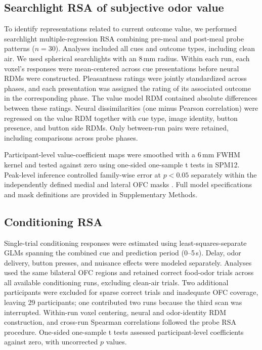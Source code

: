 \documentclass[12pt,letterpaper]{article}
\DeclareRobustCommand{\hl}{\textcolor{reviewtext}}
\begin{document}
\subsection*{Searchlight RSA of subjective odor value}

To identify representations related to current outcome value, we performed searchlight multiple-regression RSA combining pre-meal and post-meal probe patterns ($n = 30$). Analyses included all cues and outcome types, including clean air. We used spherical searchlights with an 8\,mm radius. Within each run, each voxel's responses were mean-centered across cue presentations before neural RDMs were constructed. Pleasantness ratings were jointly standardized across phases, and each presentation was assigned the rating of its associated outcome in the corresponding phase. The value model RDM contained absolute differences between these ratings. Neural dissimilarities (one minus Pearson correlation) were regressed on the value RDM together with cue type, image identity, button presence, and button side RDMs. Only between-run pairs were retained, including comparisons across probe phases.

Participant-level value-coefficient maps were smoothed with a 6\,mm FWHM kernel and tested against zero using one-sided one-sample t tests in SPM12. Peak-level inference controlled family-wise error at $p < 0.05$ separately within the independently defined medial and lateral OFC masks \citep{kahnt2012connectivity}. Full model specifications and mask definitions are provided in Supplementary Methods.

\subsection*{\hl{Conditioning RSA}}

\hl{Single-trial conditioning responses were estimated using least-squares-separate GLMs spanning the combined cue and prediction period \mbox{(0--5\,s)}. Delay, odor delivery, button presses, and nuisance effects were modeled separately. Analyses used the same bilateral OFC regions and retained correct food-odor trials across all available conditioning runs, excluding clean-air trials. Two additional participants were excluded for sparse correct trials and inadequate OFC coverage, leaving 29 participants; one contributed two runs because the third scan was interrupted. Within-run voxel centering, neural and odor-identity RDM construction, and cross-run Spearman correlations followed the probe RSA procedure. One-sided one-sample t tests assessed participant-level coefficients against zero, with uncorrected \mbox{$p$} values.}
\end{document}
